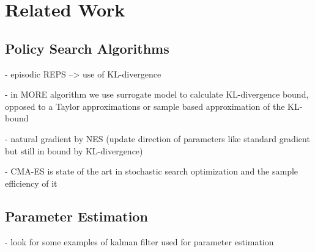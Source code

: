 
\chapter{Related Work}

\section{Policy Search Algorithms}
- episodic REPS --> use of KL-divergence

- in MORE algorithm we use surrogate model to
calculate KL-divergence bound, opposed to a Taylor approximations
or sample based approximation of the KL-bound

- natural gradient by NES (update direction of parameters like standard
gradient but still in bound by KL-divergence)


- CMA-ES is state of the art in stochastic search optimization and the sample
  efficiency of it


\section{Parameter Estimation}

- look for some examples of kalman filter used for parameter estimation
